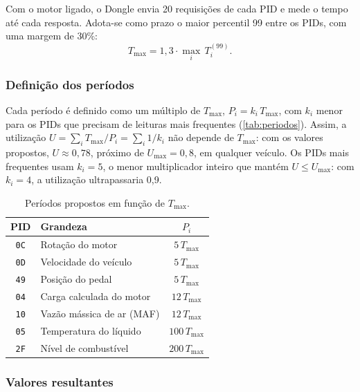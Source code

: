 \documentclass[12pt]{article}
\begin{document}
Com o motor ligado, o Dongle envia 20 requisições de cada PID e mede o tempo até cada resposta. Adota-se como prazo o maior percentil 99 entre os PIDs, com uma margem de 30\%:
\begin{equation}
  T_{\max} = 1{,}3 \cdot \max_i \, T_i^{(99)} .
\end{equation}

 
\subsubsection{Definição dos períodos}
 
Cada período é definido como um múltiplo de $T_{\max}$, $P_i = k_i\,T_{\max}$, com $k_i$ menor para os PIDs que precisam de leituras mais frequentes (\autoref{tab:periodos}). Assim, a utilização $U = \sum_i T_{\max}/P_i = \sum_i 1/k_i$ não depende de $T_{\max}$: com os valores propostos, $U \approx 0{,}78$, próximo de $U_{\max} = 0{,}8$, em qualquer veículo. Os PIDs mais frequentes usam $k_i = 5$, o menor multiplicador inteiro que mantém $U \le U_{\max}$: com $k_i = 4$, a utilização ultrapassaria 0{,}9.
 
\begin{table}[htbp]
  \centering
  \caption{Períodos propostos em função de $T_{\max}$.}
  \label{tab:periodos}
  \begin{tabular}{clc}
    \toprule
    PID & Grandeza & $P_i$ \\
    \midrule
    \texttt{0C} & Rotação do motor          & $5\,T_{\max}$ \\
    \texttt{0D} & Velocidade do veículo     & $5\,T_{\max}$ \\
    \texttt{49} & Posição do pedal          & $5\,T_{\max}$ \\
    \texttt{04} & Carga calculada do motor  & $12\,T_{\max}$ \\
    \texttt{10} & Vazão mássica de ar (MAF) & $12\,T_{\max}$ \\
    \texttt{05} & Temperatura do líquido    & $100\,T_{\max}$ \\
    \texttt{2F} & Nível de combustível      & $200\,T_{\max}$ \\
    \bottomrule
  \end{tabular}
\end{table}
 
\subsubsection{Valores resultantes}
 
\end{document}
